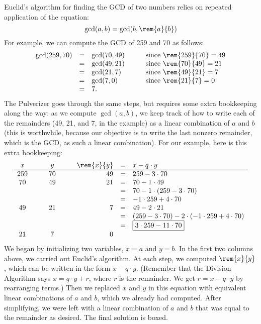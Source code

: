 \documentclass[handout]{mcs}
\begin{document}
\noindent
Euclid's algorithm for finding the GCD of two numbers relies on
repeated application of the equation: 
\[
\gcd(a, b) = \gcd(b, \rem{a}{b})
\]
For example, we can compute the GCD of 259 and 70 as follows:
\[
\begin{array}{rclcl}
\gcd(259, 70)
    & = & \gcd(70, 49) & \quad & \text{since $\rem{259}{70} = 49$}\\
    & = & \gcd(49, 21) && \text{since $\rem{70}{49} = 21$} \\
    & = & \gcd(21, 7) && \text{since $\rem{49}{21} = 7$} \\
    & = & \gcd(7, 0) && \text{since $\rem{21}{7} = 0$} \\
    & = & 7.
\end{array}
\]
The Pulverizer goes through the same steps, but requires some extra
bookkeeping along the way: as we compute $\gcd(a, b)$, we keep track
of how to write each of the remainders (49, 21, and 7, in the example)
as a linear combination of $a$ and $b$ (this is worthwhile, because
our objective is to write the last nonzero remainder, which is the
GCD, as such a linear combination).  For our example, here is this
extra bookkeeping:
\[
\begin{array}{ccccrcl}
x & \quad & y & \quad & \rem{x}{y} & = & x - q \cdot y \\ \hline
259 && 70 && 49 & = &   259 - 3 \cdot 70 \\
70 && 49 && 21  & = &   70 - 1 \cdot 49 \\
&&&&            & = &   70 - 1 \cdot (259 - 3 \cdot 70) \\
&&&&            & = &   -1 \cdot 259 + 4 \cdot 70 \\
49 && 21 && 7   & = &   49 - 2 \cdot 21 \\
&&&&            & = &   (259 - 3 \cdot 70) -
                                2 \cdot (-1 \cdot 259 + 4 \cdot 70) \\
&&&&            & = &   \fbox{$3 \cdot 259 - 11 \cdot 70$} \\
21 && 7 && 0
\end{array}
\]
We began by initializing two variables, $x = a$ and $y = b$.  In the
first two columns above, we carried out Euclid's algorithm.  At each
step, we computed $\rem{x}{y}$, which can be written in the form $x - q
\cdot y$.  (Remember that the Division Algorithm says $x = q \cdot y +
r$, where $r$ is the remainder.  We get $r = x - q \cdot y$ by
rearranging terms.)  Then we replaced $x$ and $y$ in this equation
with equivalent linear combinations of $a$ and $b$, which we already
had computed.  After simplifying, we were left with a linear
combination of $a$ and $b$ that was equal to the remainder as desired.
The final solution is boxed.
\end{document}
